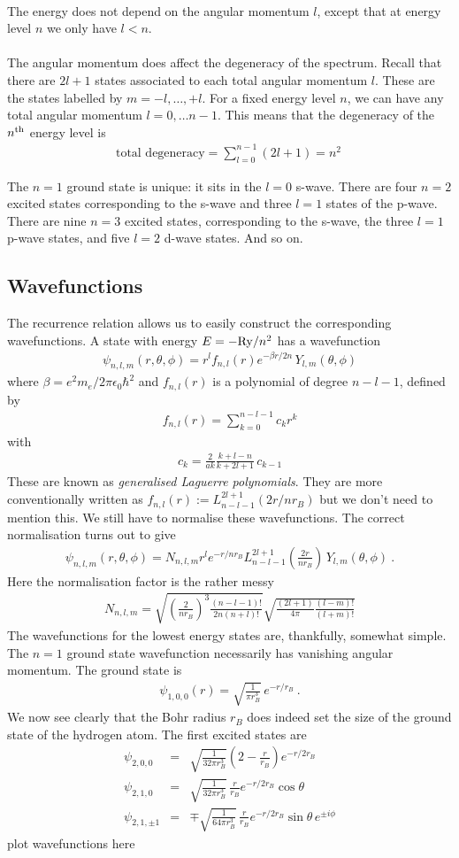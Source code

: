 \documentclass[12pt]{article}
\def\be{\begin{eqnarray}}
\def\ee{\end{eqnarray}}
\newcommand{\nn}{\nonumber}
\newcommand\para{\paragraph{}}
\newcommand{\co}{\color{olive}}
\newcommand{\cblue}{\color{blue}}
\begin{document}
{\para
{\co The energy does not depend on the angular momentum $l$, except that at energy level $n$ we only have $l<n$. 



\para
The angular momentum does affect the degeneracy of the spectrum. Recall that there are $2l+1$ states  associated to each total angular momentum $l$. These are the states labelled by $m=-l,\ldots,+l$. For a fixed energy level $n$, we can have any total angular momentum $l=0,\ldots n-1$. This means that the degeneracy  of the  $n^{\rm th}$ energy level  is
%
\be \mbox{total degeneracy} = \sum_{l=0}^{n-1} (2l+1) = n^2\ \nn\ee
%
}
The $n=1$ ground state is unique: it sits in the  $l=0$ s-wave. There are four $n=2$ excited states corresponding to the s-wave and three $l=1$ states of the p-wave. There are nine $n=3$ excited states, corresponding to the s-wave, the three $l=1$ p-wave states, and five $l=2$ d-wave states. And so on.


\subsection{Wavefunctions}



The recurrence relation allows us to easily construct the corresponding wavefunctions. {\co A state with energy $E= -{\rm Ry}/n^2$ has a wavefunction
%
\be \psi_{n,l,m}(r,\theta,\phi) = r^l f_{n,l}(r) e^{-\beta r/2n} \,Y_{l,m}(\theta,\phi)\nn\ee
%
where  $\beta ={e^2m_e}/{2\pi\epsilon_0\hbar^2}$ and $f_{n,l}(r)$ is a  polynomial of degree $n-l-1$, defined by
%
\be f_{n,l}(r) = \sum_{k=0}^{n-l-1} c_k r^k\nn\ee
%
with 
\be c_k = \frac{2}{ak} \frac{k+l-n}{k+2l+1}\,c_{k-1} \nn\ee
%
These are known as {\it generalised Laguerre polynomials}. }
{\cblue They are more conventionally written as $f_{n,l}(r):= L_{n-l-1}^{2l+1}(2r/nr_B)$ but we don't need to mention this.} We still have to normalise these wavefunctions. {\co The correct normalisation turns out to give
%
\be \psi_{n,l,m}(r,\theta,\phi) = N_{n,l,m}r^le^{-r/nr_B} L^{2l+1}_{n-l-1}\left(\frac{2r}{nr_B}\right)\,Y_{l,m}(\theta,\phi)\ .\nn\ee
%
Here the normalisation factor is the rather messy
%
\be N_{n,l,m}=   \sqrt{\left(\frac{2}{nr_B}\right)^3\frac{(n-l-1)!}{2n(n+l)!}} \sqrt{\frac{(2l+1)}{4\pi}\frac{(l-m)!}{(l+m)!}} \nn\ee
%
}
 The wavefunctions for the lowest energy states are, thankfully, somewhat simple. The $n=1$ ground state wavefunction necessarily has vanishing angular momentum. {\co The ground state is
%
\be \psi_{1,0,0}(r) = \sqrt{\frac{1}{\pi r_B^3}} \,e^{-r/r_B}\  .\nn\ee
%
%
We now see clearly that the Bohr radius $r_B$ does indeed set the size of the ground state of the hydrogen atom.  The first excited states are
%
\be \psi_{2,0,0} &=&\sqrt{\frac{1}{32\pi r_B^3}}\left(2-\frac{r}{r_B}\right) e^{-r/2r_B}
\nn\\
\psi_{2,1,0} &=&\sqrt{\frac{1}{32\pi r_B^3}}\,\frac{r}{r_B}e^{-r/2r_B}\cos\theta
\nn\\
\psi_{2,1,\pm 1} &=& \mp \sqrt{\frac{1}{64\pi r_B^3}}\,\frac{r}{r_B} e^{-r/2r_B}\sin\theta\,e^{\pm i\phi}\nn\ee
%
} {\cblue plot wavefunctions here}

}
\end{document}
